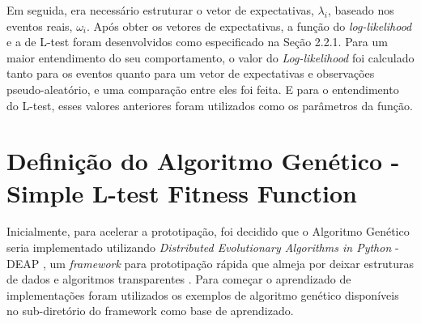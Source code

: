 


Em seguida, era necessário estruturar o vetor de expectativas, $\lambda_i$, baseado nos eventos reais, $\omega_i$. Após obter os vetores de expectativas, a função do {\it log-likelihood} e a de L-test foram desenvolvidos como especificado na Seção 2.2.1. Para um maior entendimento do seu comportamento, o valor do {\it Log-likelihood} foi calculado tanto para os eventos quanto para um vetor de expectativas e observações pseudo-aleatório, e uma comparação entre eles foi feita. E para o entendimento do L-test, esses valores anteriores foram utilizados como os parâmetros da função.

\section{Definição do Algoritmo Genético - Simple L-test Fitness Function}
Inicialmente, para acelerar a prototipação, foi decidido que o Algoritmo Genético seria implementado utilizando {\it Distributed Evolutionary Algorithms in Python} - DEAP \cite{DeRainville:2012:DPF:2330784.2330799}, um {\it framework} para prototipação rápida que almeja por deixar estruturas de dados e algoritmos transparentes \cite{DeRainville:2012:DPF:2330784.2330799}. Para começar o aprendizado de implementações foram utilizados os exemplos de algoritmo genético disponíveis no sub-diretório do framework como base de aprendizado.\\

